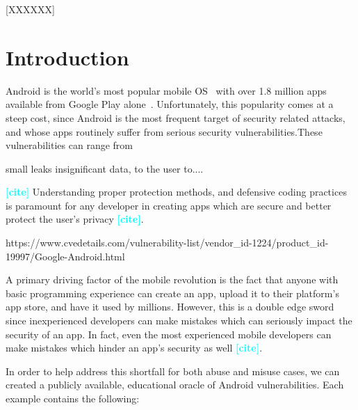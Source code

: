 \documentclass{sig-alternate-05-2015}
\newcommand{\todo}[1]{\textcolor{cyan}{\textbf{[#1]}}}
\begin{document}
[XXXXXX]





\section{Introduction}

Android is the world's most popular mobile OS~\cite{OSMarketShare_URL} with over 1.8 million apps available from Google Play alone~\cite{statistica_url}. Unfortunately, this popularity comes at a steep cost, since Android is the most frequent target of security related attacks, and whose apps routinely suffer from serious security vulnerabilities.These vulnerabilities can range from 

small leaks insignificant data, to the user to.... 

\cite{Android_cv_url}

\todo{cite} Understanding proper protection methods, and defensive coding practices is paramount for any developer in creating apps which are secure and better protect the user's privacy \todo{cite}. 

https://www.cvedetails.com/vulnerability-list/vendor_id-1224/product_id-19997/Google-Android.html


A primary driving factor of the mobile revolution is the fact that anyone with basic programming experience can create an app, upload it to their platform's app store, and have it used by millions. However, this is a double edge sword since  inexperienced developers can make mistakes which can seriously impact the security of an app. In fact, even the most experienced mobile developers can make mistakes which hinder an app's security as well \todo{cite}.





In order to help address this shortfall for both abuse and misuse cases, we can created a publicly available, educational oracle of Android vulnerabilities. Each example contains the following:
\end{document}
